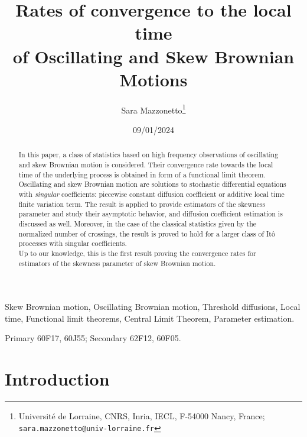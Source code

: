 \documentclass[12pt]{article}
\numberwithin{equation}{section}
\theoremstyle{definition}
\theoremstyle{remark}
\begin{document}
\title{Rates of convergence  
to the local time \\
of Oscillating and Skew Brownian Motions
}
\author{
Sara Mazzonetto\footnote{Universit\'e de Lorraine, CNRS, Inria, IECL, F-54000 Nancy, France; \texttt{sara.mazzonetto@univ-lorraine.fr}}
}

\date{09/01/2024}

\maketitle


\begin{abstract}
In this paper, a class of statistics based on high frequency observations of oscillating and skew Brownian motion is considered. 
%
Their convergence rate towards the local time of the underlying process is obtained in form of a functional limit theorem.
%
Oscillating 
and skew Brownian motion are solutions to stochastic differential equations with {\em singular\/} coefficients: piecewise constant diffusion coefficient or additive local time finite variation term. 
The result is applied to provide estimators of the skewness parameter and study their asymptotic behavior, %
and diffusion coefficient estimation is discussed as well.
%
Moreover, in the case of the 
classical 
statistics given by the
normalized number of crossings, 
the result is proved to hold for a larger class of It\^o processes with singular coefficients.\\
%
Up to our knowledge, 
this is the first result proving the convergence rates for estimators of the skewness parameter of skew Brownian motion.
%
\end{abstract}

\bigskip

 Skew Brownian motion, Oscillating Brownian motion, Threshold diffusions, Local time, Functional limit theorems,  Central Limit Theorem, Parameter estimation. %

\bigskip

 Primary 60F17, %
60J55;  %
Secondary 
62F12, %
60F05. %





\section{Introduction}
\end{document}
